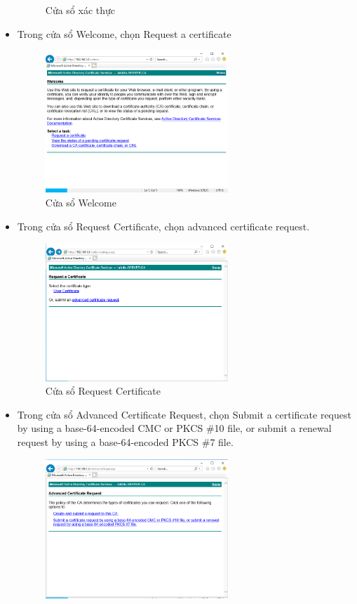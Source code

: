 \documentclass[13pt]{report}
\begin{document}
\begin{itemize}
\begin{figure}[htp]
			\caption{Cửa sổ xác thực}
		\end{figure}
		\item Trong cửa sổ Welcome, chọn Request a certificate
		\begin{figure}[htp]
			\centering
			\includegraphics[width=0.65\textwidth]{image/Gui/SSL/9.png}
			\caption{Cửa sổ Welcome}
		\end{figure}
		\newpage
		\item Trong cửa sổ Request Certificate, chọn advanced certificate request.
		\begin{figure}[htp]
			\centering
			\includegraphics[width=0.65\textwidth]{image/Gui/SSL/10.png}
			\caption{Cửa sổ Request Certificate}
		\end{figure}
		\item Trong cửa sổ Advanced Certificate Request, chọn Submit a certificate request by using a base-64-encoded CMC or PKCS \#10 file, or submit a renewal request by using a base-64-encoded PKCS \#7 file.
		\begin{figure}[htp]
			\centering
			\includegraphics[width=0.65\textwidth]{image/Gui/SSL/11.png}

\end{figure}
\end{itemize}
\end{document}
